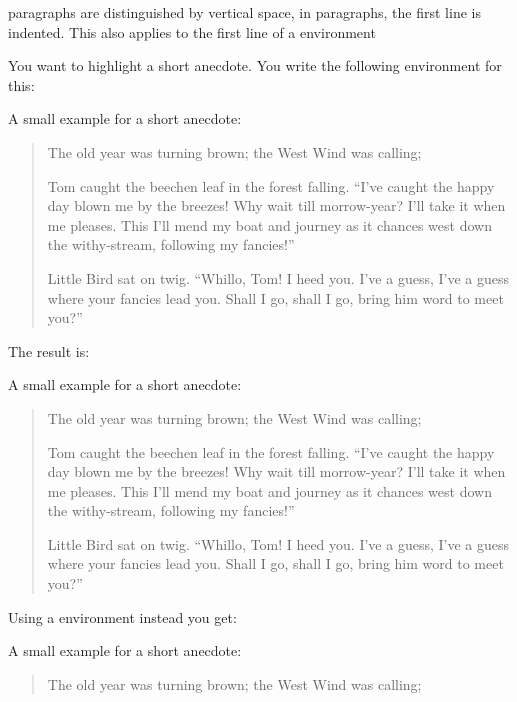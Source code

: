      paragraphs are distinguished by vertical space, in
     paragraphs, the first line is indented. This also
    applies to the first line of a 
    environment%
  \fi %
    \begin{Example}
      You want to highlight a short anecdote. You write the following
       environment for this:%
\begin{lstcode}
  A small example for a short anecdote:
  \begin{quotation}
    The old year was turning brown; the West Wind was
    calling;

    Tom caught the beechen leaf in the forest falling.
    ``I've caught the happy day blown me by the breezes!
    Why wait till morrow-year? I'll take it when me pleases.
    This I'll mend my boat and journey as it chances
    west down the withy-stream, following my fancies!''

    Little Bird sat on twig. ``Whillo, Tom! I heed you.
    I've a guess, I've a guess where your fancies lead you.
    Shall I go, shall I go, bring him word to meet you?''
  \end{quotation}
\end{lstcode}
      The result is:
      \begin{ShowOutput}
        A small example for a short anecdote:
        \begin{quotation}
          The old year was turning brown; the West Wind was
          calling;

          Tom caught the beechen leaf in the forest falling.
          ``I've caught the happy day blown me by the breezes!
          Why wait till morrow-year? I'll take it when me pleases.
          This I'll mend my boat and journey as it chances
          west down the withy-stream, following my fancies!''

          Little Bird sat on twig. ``Whillo, Tom! I heed you.
          I've a guess, I've a guess where your fancies lead you.
          Shall I go, shall I go, bring him word to meet you?''
        \end{quotation}
      \end{ShowOutput}
      Using a  environment instead you get:
      \begin{ShowOutput}
        A small example for a short anecdote:
        \begin{quote}\setlength{\parskip}{4pt plus 2pt minus 2pt}
          The old year was turning brown; the West Wind was
          calling;


\end{quote}
\end{ShowOutput}
\end{Example}

